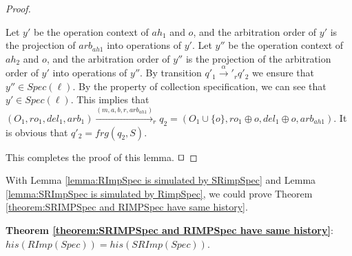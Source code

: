 \begin {proof}
\begin{itemize}
    Let $y'$ be the operation context of $\mathit{ah}_1$ and $o$, and the arbitration order of $y'$ is the projection of $\mathit{arb}_{\mathit{ah1}}$ into operations of $y'$. Let $y''$ be the operation context of $\mathit{ah}_2$ and $o$, and the arbitration order of $y''$ is the projection of the arbitration order of $y'$ into operations of $y''$. By transition $q'_1 {\xrightarrow{\alpha}'}_r q'_2$ we ensure that $y'' \in \mathit{Spec}(\ell)$. By the property of collection specification, we can see that $y' \in \mathit{Spec}(\ell)$. This implies that $(O_1,\mathit{ro}_1,\mathit{del}_1,\mathit{arb}_1) {\xrightarrow{(m,a,b,r,\mathit{arb}_{\mathit{ah1}})}}_r q_2 =  (O_1 \cup \{ o \},\mathit{ro}_1 \oplus o ,\mathit{del}_1 \oplus o,\mathit{arb}_{\mathit{ah1}})$. It is obvious that $q'_2 = \mathit{frg}(q_2,S)$.
\end{itemize}
This completes the proof of this lemma. $\qed$
\end {proof}



With Lemma \ref{lemma:RImpSpec is simulated by SRimpSpec} and Lemma \ref{lemma:SRImpSpec is simulated by RimpSpec}, we could prove Theorem \ref{theorem:SRIMPSpec and RIMPSpec have same history}.



{\noindent \bf Theorem \ref{theorem:SRIMPSpec and RIMPSpec have same history}}: $\mathit{his}(\mathit{RImp}(\mathit{Spec})) = \mathit{his}(\mathit{SRImp}(\mathit{Spec}))$.

